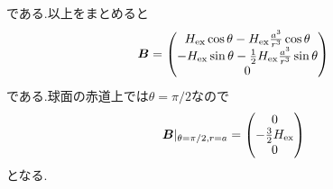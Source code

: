 \documentclass[uplatex,a4j,11pt,dvipdfmx]{jsarticle}
\begin{document}
である.以上をまとめると
\begin{align}
  {\bm B}=\left(
    \begin{matrix}
      H_{\rm ex}\cos\theta-H_{\rm ex}\frac{a^3}{r^3}\cos\theta\\
      -H_{\rm ex}\sin\theta-\frac{1}{2}H_{\rm ex}\frac{a^3}{r^3}\sin\theta\\
      0
    \end{matrix}
  \right)
\end{align}
である.球面の赤道上では$\theta=\pi/2$なので
\begin{align}
  {\bm B}|_{\theta=\pi/2,r=a}=\left(
    \begin{matrix}
      0\\
      -\frac{3}{2}H_{\rm ex}\\
      0
    \end{matrix}
  \right)
\end{align}
となる.\cite{resumeri7:online}

\end{document}
